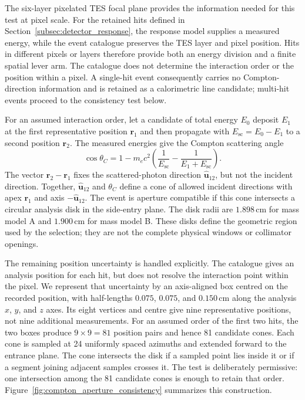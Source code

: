 \documentclass[11pt]{article}
\begin{document}
The six-layer pixelated TES focal plane provides the information needed for
this test at pixel scale. For the retained hits defined in
Section~\ref{subsec:detector_response}, the response model supplies a measured
energy, while the event catalogue preserves the TES layer and pixel position.
Hits in different pixels or layers therefore provide both an energy division
and a finite spatial lever arm. The catalogue does not determine the interaction
order or the position within a pixel. A single-hit event consequently carries
no Compton-direction information and is retained as a calorimetric line
candidate; multi-hit events proceed to the consistency test below.

For an assumed interaction order, let a candidate of total energy $E_0$ deposit
$E_1$ at the first representative position $\mathbf r_1$ and then propagate
with $E_{\mathrm{sc}}=E_0-E_1$ to a second position $\mathbf r_2$. The measured
energies give the Compton scattering angle
\begin{equation}
  \cos\theta_C =
  1 - m_ec^2\left(\frac{1}{E_{\mathrm{sc}}}
  - \frac{1}{E_1+E_{\mathrm{sc}}}\right).
\end{equation}
The vector $\mathbf r_2-\mathbf r_1$ fixes the scattered-photon direction
$\hat{\mathbf u}_{12}$, but not the incident direction. Together,
$\hat{\mathbf u}_{12}$ and $\theta_C$ define a cone of allowed incident
directions with apex $\mathbf r_1$ and axis $-\hat{\mathbf u}_{12}$. The event
is aperture compatible if this cone intersects a circular analysis disk in the
side-entry plane. The disk radii are $1.898\,\mathrm{cm}$ for mass model A and
$1.900\,\mathrm{cm}$ for mass model B. These disks define the geometric region
used by the selection; they are not the complete physical windows or collimator
openings.

The remaining position uncertainty is handled explicitly. The catalogue gives
an analysis position for each hit, but does not resolve the interaction point
within the pixel. We represent that uncertainty by an axis-aligned box centred
on the recorded position, with half-lengths $0.075$, $0.075$, and
$0.150\,\mathrm{cm}$ along the analysis $x$, $y$, and $z$ axes. Its eight
vertices and centre give nine representative positions, not nine additional
measurements. For an assumed order of the first two hits, the two boxes produce
$9\times9=81$ position pairs and hence 81 candidate cones. Each cone is sampled
at 24 uniformly spaced azimuths and extended forward to the entrance plane. The
cone intersects the disk if a sampled point lies inside it or if a segment
joining adjacent samples crosses it. The test is deliberately permissive: one
intersection among the 81 candidate cones is enough to retain that order.
Figure~\ref{fig:compton_aperture_consistency} summarizes this construction.
\end{document}
